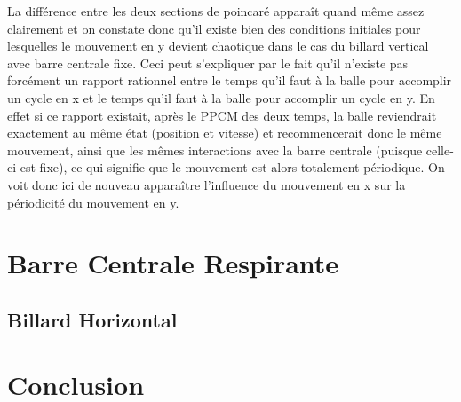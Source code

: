 \documentclass[a4paper]{report}
\begin{document}
La différence entre les deux sections de poincaré apparaît quand même assez clairement et on constate donc qu'il existe bien des conditions initiales pour lesquelles le mouvement en y devient chaotique dans le cas du billard vertical avec barre centrale fixe. Ceci peut s'expliquer par le fait qu'il n'existe pas forcément un rapport rationnel entre le temps qu'il faut à la balle pour accomplir un cycle en x et le temps qu'il faut à la balle pour accomplir un cycle en y. En effet si ce rapport existait, après le PPCM des deux temps, la balle reviendrait exactement au même état (position et vitesse) et recommencerait donc le même mouvement, ainsi que les mêmes interactions avec la barre centrale (puisque celle-ci est fixe), ce qui signifie que le mouvement est alors totalement périodique. On voit donc ici de nouveau apparaître l'influence du mouvement en x sur la périodicité du mouvement en y.

\chapter{Barre Centrale Respirante}

\section{Billard Horizontal}

\chapter{Conclusion}

\nocite{*}
\listoffigures
{}



\end{document}
